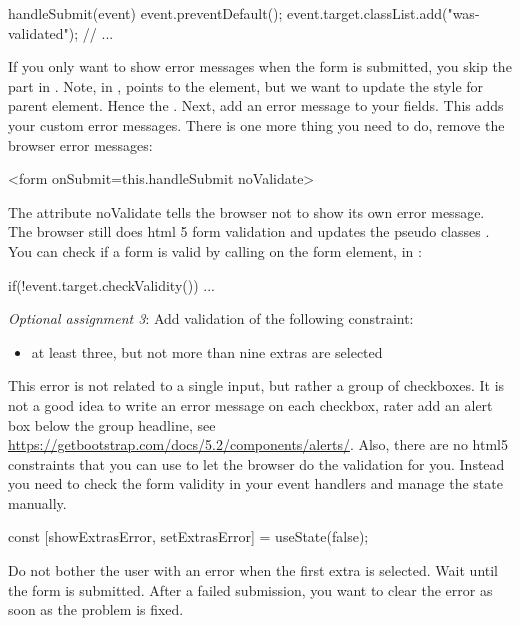 \documentclass[fleqn, article, a4paper]{memoir}
\begin{document}
\begin{Assignments}
\begin{Code}
{}
handleSubmit(event){
  event.preventDefault();
  event.target.classList.add("was-validated");
  // ...
}
\end{Code}
If you only want to show error messages when the form is submitted, you skip the part in . Note, in ,  points to the  element, but we want to update the style for parent  element. Hence the . Next, add an error message to your  fields. This adds your custom error messages. There is one more thing you need to do, remove the browser error messages:
\begin{Code}
<form onSubmit={this.handleSubmit} noValidate>
\end{Code}
The attribute noValidate tells the browser not to show its own error message. The browser still does html 5 form validation and updates the pseudo classes . You can check if a form is valid by calling  on the form element, in :
\begin{Code}
if(!event.target.checkValidity()){ ... }
\end{Code}

\item \emph{Optional assignment 3}: Add validation of the following constraint:
\begin{itemize}
  \item at least three, but not more than nine extras are selected
\end{itemize}
This error is not related to a single input, but rather a group of checkboxes. It is not a good idea to write an error message on each checkbox, rater add an alert box below the group headline, see \url{https://getbootstrap.com/docs/5.2/components/alerts/}. Also, there are no html5 constraints that you can use to let the browser do the validation for you. Instead you need to check the form validity in your event handlers and manage the state manually.
\begin{Code}
const [showExtrasError, setExtrasError] = useState(false);
\end{Code}
Do not bother the user with an error when the first extra is selected. Wait until the form is submitted. After a failed submission, you want to clear the error as soon as the problem is fixed.

\end{Assignments}


\end{document}
